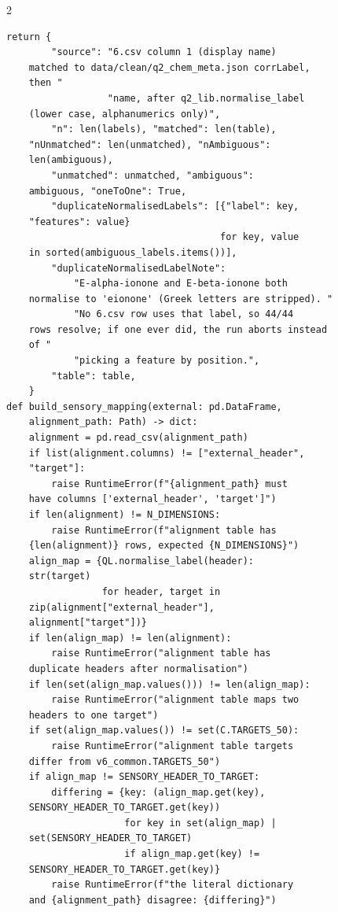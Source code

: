 \begin{multicols}{2}
\begin{Verbatim}[fontsize=\scriptsize]
    return {
        "source": "6.csv column 1 (display name)
    matched to data/clean/q2_chem_meta.json corrLabel,
    then "
                  "name, after q2_lib.normalise_label
    (lower case, alphanumerics only)",
        "n": len(labels), "matched": len(table),
    "nUnmatched": len(unmatched), "nAmbiguous":
    len(ambiguous),
        "unmatched": unmatched, "ambiguous":
    ambiguous, "oneToOne": True,
        "duplicateNormalisedLabels": [{"label": key,
    "features": value}
                                      for key, value
    in sorted(ambiguous_labels.items())],
        "duplicateNormalisedLabelNote":
            "E-alpha-ionone and E-beta-ionone both
    normalise to 'eionone' (Greek letters are stripped). "
            "No 6.csv row uses that label, so 44/44
    rows resolve; if one ever did, the run aborts instead
    of "
            "picking a feature by position.",
        "table": table,
    }
def build_sensory_mapping(external: pd.DataFrame,
    alignment_path: Path) -> dict:
    alignment = pd.read_csv(alignment_path)
    if list(alignment.columns) != ["external_header",
    "target"]:
        raise RuntimeError(f"{alignment_path} must
    have columns ['external_header', 'target']")
    if len(alignment) != N_DIMENSIONS:
        raise RuntimeError(f"alignment table has
    {len(alignment)} rows, expected {N_DIMENSIONS}")
    align_map = {QL.normalise_label(header):
    str(target)
                 for header, target in
    zip(alignment["external_header"],
    alignment["target"])}
    if len(align_map) != len(alignment):
        raise RuntimeError("alignment table has
    duplicate headers after normalisation")
    if len(set(align_map.values())) != len(align_map):
        raise RuntimeError("alignment table maps two
    headers to one target")
    if set(align_map.values()) != set(C.TARGETS_50):
        raise RuntimeError("alignment table targets
    differ from v6_common.TARGETS_50")
    if align_map != SENSORY_HEADER_TO_TARGET:
        differing = {key: (align_map.get(key),
    SENSORY_HEADER_TO_TARGET.get(key))
                     for key in set(align_map) |
    set(SENSORY_HEADER_TO_TARGET)
                     if align_map.get(key) !=
    SENSORY_HEADER_TO_TARGET.get(key)}
        raise RuntimeError(f"the literal dictionary
    and {alignment_path} disagree: {differing}")


\end{Verbatim}
\end{multicols}
